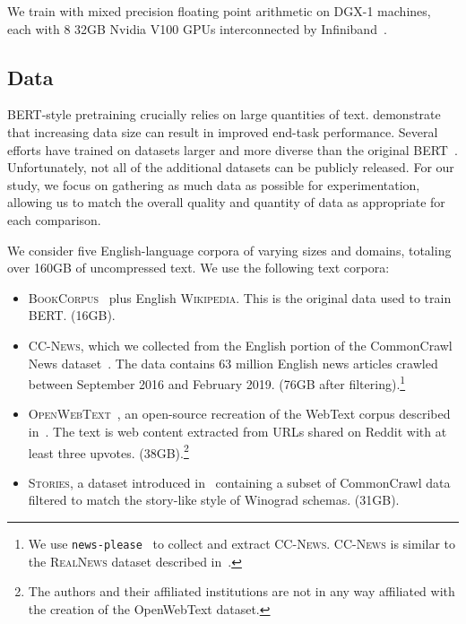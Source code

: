 \documentclass[11pt]{article}
\begin{document}
We train with mixed precision floating point arithmetic on DGX-1 machines, each with 8  32GB Nvidia V100 GPUs interconnected by Infiniband~\cite{micikevicius2018mixed}.

\subsection{Data} \label{sec:data}

BERT-style pretraining crucially relies on large quantities of text.  demonstrate that increasing data size can result in improved end-task performance. Several efforts have trained on datasets larger and more diverse than the original BERT~\cite{radford2019language,yang2019xlnet,zellers2019neuralfakenews}.
Unfortunately, not all of the additional datasets can be publicly released. For our study, we focus on gathering as much data as possible for experimentation, allowing us to match the overall quality and quantity of data as appropriate for each comparison. 

We consider five English-language corpora of varying sizes and domains, totaling over 160GB of uncompressed text. We use the following text corpora:
\begin{itemize}[leftmargin=*]
\setlength\itemsep{0em}
\item \textsc{BookCorpus}~\cite{moviebook} plus English \textsc{Wikipedia}. This is the original data used to train BERT. (16GB).
\item \textsc{CC-News}, which we collected from the English portion of the CommonCrawl News dataset~\cite{nagel2016ccnews}. The data contains 63 million English news articles crawled between September 2016 and February 2019. (76GB after filtering).\footnote{We use \texttt{news-please}~\cite{hamborg2017newsplease} to collect and extract \textsc{CC-News}. \textsc{CC-News} is similar to the \textsc{RealNews} dataset described in~.}
\item \textsc{OpenWebText}~\cite{gokaslan2019openwebtext}, an open-source recreation of the WebText corpus described in~. The text is web content extracted from URLs shared on Reddit with at least three upvotes. (38GB).\footnote{The authors and their affiliated institutions are not in any way affiliated with the creation of the OpenWebText dataset.}
\item \textsc{Stories}, a dataset introduced in~ containing a subset of CommonCrawl data filtered to match the story-like style of Winograd schemas. (31GB).
\end{itemize}
\end{document}
